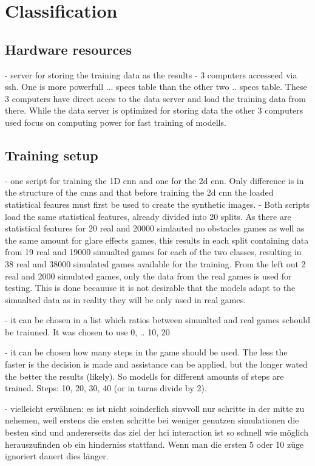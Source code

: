 \chapter{Classification}

\section{Hardware resources}
- server for storing the training data as the results 
- 3 computers accesseed via ssh. One is more powerfull ... specs table than the other two .. specs table. These 3 computers have direct acces to the data server and load the training data from there. While the data server is optimized for storing data the other 3 computers used focus on computing power for fast training of modells. 

\section{Training setup}
- one script for training the 1D cnn and one for the 2d cnn. Only difference is in the structure of the cnns and that before training the 2d cnn the loaded statistical feaures must first be used to create the synthetic images.
- Both scripts load the same statistical features, already divided into 20 splits. As there are statistical features for 20 real and 20000 simlauted no obstacles games as well as the same amount for glare effects games, this results in each split containing data from 19 real and 19000 simualted games for each of the two classes, resulting in 38 real and 38000 simulated games available for the training. From the left out 2 real and 2000 simulated games, only the data from the real games is used for testing. This is done becauuse it is not desirable that the models adapt to the simualted data as in reality they will be only used in real games. 



- it can be chosen in a list which ratios between simualted and real games schould be traiuned. It was chosen to use 0, .. 10, 20

- it can be chosen how many steps in the game should be used. The less the faster is the decision is made and assistance can be applied, but the longer wated the better the results (likely). So modells for different amounts of steps are trained. Steps: 10, 20, 30, 40 (or in turns divide by 2). 

- vielleicht erwähnen: es ist nicht soinderlich sinvvoll nur schritte in der mitte zu nehemen, weil erstens die ersten schritte bei weniger genutzen simulationen die besten sind und andererseits das ziel der hci interaction ist so schnell wie möglich herauszufinden ob ein hinderniss stattfand. Wenn man die ersten 5 oder 10 züge ignoriert dauert dies länger.

